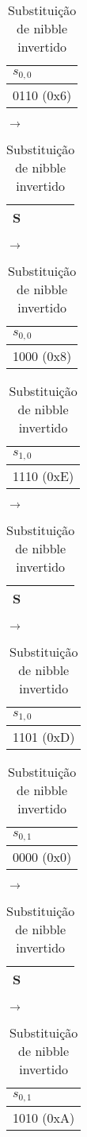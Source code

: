 \documentclass[
    article,            %
    11pt,               %
    oneside,            %
    a4paper,            %
    english,            %
    brazil,             %
    sumario=tradicional,
    ]{abntex2}
\begin{document}
\label{subsubsub:substituicao-nibble-round1-dec}

\begin{table}[H]
\centering
\caption{Substituição de nibble invertido}
\label{round1-nibbles-change-inverted}
\begin{tabular}{|l|}
\hline
$s_{0,0}$  \\ \hline
0110 (0x6)       \\ \hline
\end{tabular}
$\longrightarrow$
\begin{tabular}{|l|}
\hline
S  \\ \hline
\end{tabular}
$\longrightarrow$
\begin{tabular}{|l|}
\hline
$s_{0,0}$  \\ \hline
1000 (0x8)      \\ \hline
\end{tabular}

\vspace{0.5cm}

\begin{tabular}{|l|}
\hline
$s_{1,0}$  \\ \hline
1110 (0xE)       \\ \hline
\end{tabular}
$\longrightarrow$
\begin{tabular}{|l|}
\hline
S  \\ \hline
\end{tabular}
$\longrightarrow$
\begin{tabular}{|l|}
\hline
$s_{1,0}$  \\ \hline
1101 (0xD)      \\ \hline
\end{tabular}

\vspace{0.5cm}

\begin{tabular}{|l|}
\hline
$s_{0,1}$  \\ \hline
0000 (0x0)       \\ \hline
\end{tabular}
$\longrightarrow$
\begin{tabular}{|l|}
\hline
S  \\ \hline
\end{tabular}
$\longrightarrow$
\begin{tabular}{|l|}
\hline
$s_{0,1}$  \\ \hline
1010 (0xA)      \\ \hline
\end{tabular}


\end{table}
\end{document}
